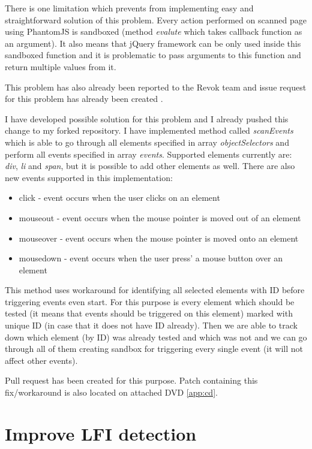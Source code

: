 		There is one limitation which prevents from implementing easy and straightforward solution of this problem. Every action performed on scanned page using PhantomJS is sandboxed (method \textit{evalute} which takes callback function as an argument). It also means that jQuery framework can be only used inside this sandboxed function and it is problematic to pass arguments to this function and return multiple values from it.
		
		This problem has also already been reported to the Revok team and issue request for this problem has already been created \cite{GitHubIssue2}.
		
		I have developed possible solution for this problem and I already pushed this change to my forked repository. I have implemented method called \textit{scanEvents} which is able to go through all elements specified in array \textit{objectSelectors} and perform all events specified in array \textit{events}. Supported elements currently are: \textit{div}, \textit{li} and \textit{span}, but it is possible to add other elements as well. There are also new events supported in this implementation:
		
		\begin{itemize}
			\item click - event occurs when the user clicks on an element
			\item mouseout - event occurs when the mouse pointer is moved out of an element
			\item mouseover - event occurs when the mouse pointer is moved onto an element
			\item mousedown - event occurs when the user press' a mouse button over an element
		\end{itemize}
		
	This method uses workaround for identifying all selected elements with ID before triggering events even start. For this purpose is every element which should be tested (it means that events should be triggered on this element) marked with unique ID (in case that it does not have ID already). Then we are able to track down which element (by ID) was already tested and which was not and we can go through all of them creating sandbox for triggering every single event (it will not affect other events).

	Pull request \cite{GitHubPullRequest1} has been created for this purpose. Patch containing this fix/workaround is also located on attached DVD \ref{app:cd}.

	\section{Improve LFI detection}
	
